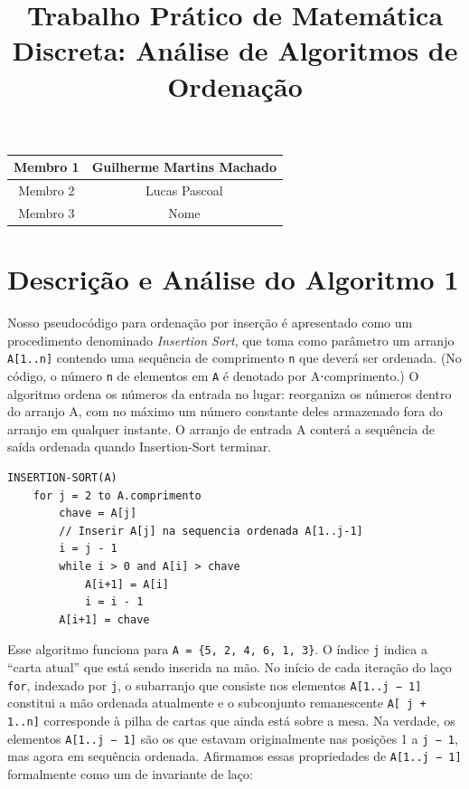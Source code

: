\documentclass{article}
\title{Trabalho Prático de Matemática Discreta: Análise de Algoritmos de Ordenação}
\begin{document}
\maketitle

\begin{center}
\begin{tabular} {c c}
  \hline
  Membro 1 & Guilherme Martins Machado \\ [1ex]
  \hline
  Membro 2 & Lucas Pascoal \\ [1ex]
  \hline
  Membro 3 & Nome \\ [1ex]
  \hline
\end{tabular}
\end{center}

\section{Descrição e Análise do Algoritmo 1}

Nosso pseudocódigo para ordenação por inserção é apresentado como um procedimento denominado \textit{Insertion Sort}, que toma como parâmetro um arranjo \texttt{A[1..n]} contendo uma sequência de comprimento \texttt{n} que deverá ser ordenada. (No código, o número \texttt{n} de elementos em \texttt{A} é denotado por A⋅comprimento.) O algoritmo ordena os números da entrada no lugar: reorganiza os números dentro do arranjo A, com no máximo um número constante deles armazenado fora do arranjo em qualquer instante. O arranjo de entrada A conterá a sequência de saída ordenada quando Insertion-Sort terminar.

\begin{verbatim}
INSERTION-SORT(A)
    for j = 2 to A.comprimento
        chave = A[j]
        // Inserir A[j] na sequencia ordenada A[1..j-1]
        i = j - 1
        while i > 0 and A[i] > chave
            A[i+1] = A[i]
            i = i - 1
        A[i+1] = chave
\end{verbatim}

Esse algoritmo funciona para \texttt{A = \{5, 2, 4, 6, 1, 3\}}. O índice \texttt{j} indica a ``carta atual'' que está sendo inserida na mão. No início de cada iteração do laço \texttt{for}, indexado por \texttt{j}, o subarranjo que consiste nos elementos \texttt{A[1..j − 1]} constitui a mão ordenada atualmente e o subconjunto remanescente \texttt{A[ j + 1..n]} corresponde à pilha de cartas que ainda está sobre a mesa. Na verdade, os elementos \texttt{A[1..j − 1]} são os que estavam originalmente nas posições 1 a \texttt{j − 1}, mas agora em sequência ordenada. Afirmamos essas propriedades de \texttt{A[1..j − 1]} formalmente como um de invariante de laço:
\end{document}
